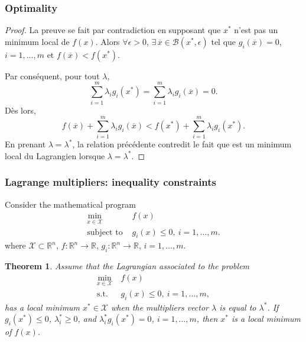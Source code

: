 \documentclass[usepdftitle=false]{beamer}
\newtheorem{thm}{Theorem}
\def\cB{\mathcal{B}}
\def\cX{\mathcal{X}}
\def\RR{\mathbb{R}}
\begin{document}
\begin{frame}
\frametitle{Optimality}

\begin{proof}
	La preuve se fait par contradiction en supposant que $x^*$ n'est pas un minimum local de $f(x)$.
	Alors $\forall \epsilon > 0$, $\exists\, \overline{x} \in \cB(x^*, \epsilon)$ tel que $g_i(\overline{x}) = 0$, $i = 1,\ldots,m$ et $f(\overline{x}) < f(x^*)$.
	
Par conséquent, pour tout $\lambda$,
	$$
	\sum_{i = 1}^{m} \lambda_i g_i(x^*) = \sum_{i = 1}^{m} \lambda_i g_i(\overline{x}) = 0.
	$$
	Dès lors,
$$
f(\overline{x}) + \sum_{i = 1}^{m} \lambda_i g_i(\overline{x}) < f(x^*) + \sum_{i = 1}^{m} \lambda_i g_i(x^*).
$$
En prenant $\lambda = \lambda^*$, la relation précédente contredit le fait que est un
minimum local du Lagrangien lorsque $\lambda = \lambda^*$.
\end{proof}

\end{frame}

\begin{frame}
\frametitle{Lagrange multipliers: inequality constraints}

Consider the mathematical program
\begin{align*}
\min_{x \in \cX} \ & f(x) \\
\mbox{subject to } & g_i(x) \leq 0,\ i = 1,\ldots,m.
\end{align*}
where $\cX \subset \RR^n$, $f: \RR^n \rightarrow \RR$, $g_i: \RR^n \rightarrow \RR$, $i = 1,\ldots,m$.

\mbox{}

\begin{thm}
Assume that the Lagrangian associated to the problem
\begin{align*}
\min_{x \in \cX} \ & f(x) \\
\mbox{s.t. } & g_i(x) \leq 0,\ i = 1,\ldots,m,
\end{align*}
has a local minimum $x^* \in \cX$ when the multipliers vector $\lambda$ is equal to $\lambda^*$.
If $g_i(x^*) \leq 0$, $\lambda^*_i \geq 0$, and $\lambda^*_i g_i(x^*) = 0$, $i = 1,\ldots,m$, then $x^*$ is a local minimum of $f(x)$.
\end{thm}

\end{frame}
\end{document}
